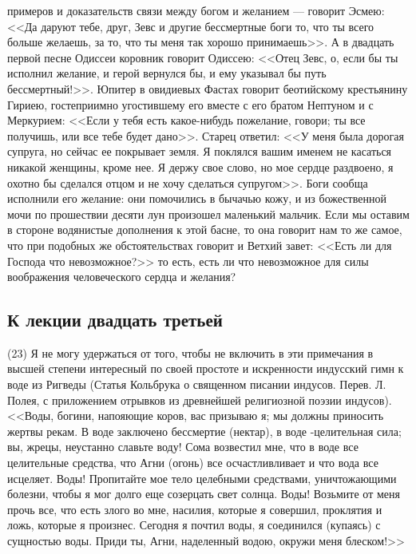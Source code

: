 \documentclass[12pt]{article}
\begin{document}
примеров и доказательств связи между богом и желанием --- говорит Эсмею: <<Да даруют тебе, друг, Зевс и другие бессмертные боги то, что ты всего больше желаешь, за то, что ты меня так хорошо принимаешь>>. А в двадцать первой песне Одиссеи коровник говорит Одиссею: <<Отец Зевс, о, если бы ты исполнил желание, и герой вернулся бы, и ему указывал бы путь бессмертный!>>. Юпитер в овидиевых Фастах говорит беотийскому крестьянину Гириею, гостеприимно угостившему его вместе с его братом Нептуном и с Меркурием: <<Если у тебя есть какое-нибудь пожелание, говори; ты все получишь, или все тебе будет дано>>. Старец ответил: <<У меня была дорогая супруга, но сейчас ее покрывает земля. Я поклялся вашим именем не касаться никакой женщины, кроме нее. Я держу свое слово, но мое сердце раздвоено, я охотно бы сделался отцом и не хочу сделаться супругом>>. Боги сообща исполнили его желание: они помочились в бычачью кожу, и из божественной мочи по прошествии десяти лун произошел маленький мальчик. Если мы оставим в стороне водянистые дополнения к этой басне, то она говорит нам то же самое, что при подобных же обстоятельствах говорит и Ветхий завет: <<Есть ли для Господа что невозможное?>>  то есть, есть ли что невозможное для силы воображения человеческого сердца и желания? 

\subsection*{К лекции двадцать третьей}

(23) Я не могу удержаться от того, чтобы не включить в эти примечания в высшей степени интересный по своей простоте и искренности индусский гимн к воде из Ригведы (Статья Кольбрука о священном писании индусов. Перев. Л. Полея, с приложением отрывков из древнейшей религиозной поэзии индусов). <<Воды, богини, напояющие коров, вас призываю я; мы должны приносить жертвы рекам. В воде заключено бессмертие (нектар), в воде -целительная сила; вы, жрецы, неустанно славьте воду! Сома возвестил мне, что в воде все целительные средства, что Агни (огонь) все осчастливливает и что вода все исцеляет. Воды! Пропитайте мое тело целебными средствами, уничтожающими болезни, чтобы я мог долго еще созерцать свет солнца. Воды! Возьмите от меня прочь все, что есть злого во мне, насилия, которые я совершил, проклятия и ложь, которые я произнес. Сегодня я почтил воды, я соединился (купаясь) с сущностью воды. Приди ты, Агни, наделенный водою, окружи меня блеском!>> 
\end{document}
